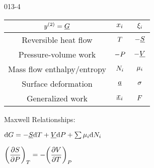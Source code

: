 \begin{mitframe}{013-4} %

    

\begin{longtable}{ | c | c | c | } 
 \hline
 	$ y^{(2)}= \uline{\gibbs}$& $\conjcoor$ & $\conjcoortwo_{\state}$ \\ \hline
	Reversible heat flow & $\Temp$ & $-\uline{\entropy}$ \\ \hline 
	Pressure-volume work & $-\p$ & $-\uline{\vol}$  \\ \hline
 	Mass flow enthalpy/entropy& $\nummoles_{\state}$ & $\chempot_{\state}$ \\ \hline   
	Surface deformation & $\totalsa$ & $\surftens$ \\ \hline   
    Generalized work & $\gendisp_{\state}$ & $\force$ \\ \hline
 
 
\end{longtable}

    
    
\begin{listone}
        
    \item Maxwell Relationships:
        
    \item $\mathrm{d}\gibbs = -\uline{\entropy}\mathrm{d}\Temp + \uline{\vol}\mathrm{d}\p + \sum\nolimits\chempot_{\state}\mathrm{d}\nummoles_{\state}$
         
    \item $\bigg(\dfrac{\partial\entropy}{\partial\p}\bigg)_{\Temp} = -\bigg(\dfrac{\partial\vol}{\partial\Temp}\bigg)_{\p}$
    
\end{listone}			

\end{mitframe}